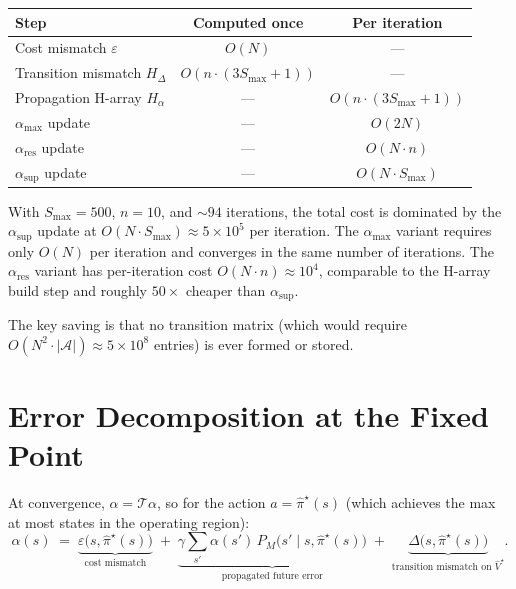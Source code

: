 \documentclass[11pt]{article}
\newcommand{\Smax}{S_{\max}}
\newcommand{\pihatstar}{\hat\pi^\star}
\newcommand{\Vhatstar}{\hat V^\star}
\newcommand{\alphares}{\alpha_{\mathrm{res}}}
\begin{document}
\begin{center}
\begin{tabular}{lcc}
\toprule
Step & Computed once & Per iteration \\
\midrule
Cost mismatch $\varepsilon$ & $O(N)$ & --- \\
Transition mismatch $H_\Delta$ & $O(n \cdot (3\Smax+1))$ & --- \\
Propagation H-array $H_\alpha$ & --- & $O(n \cdot (3\Smax+1))$ \\
$\alpha_{\max}$ update & --- & $O(2N)$ \\
$\alphares$ update & --- & $O(N \cdot n)$ \\
$\alpha_{\sup}$ update & --- & $O(N \cdot \Smax)$ \\
\bottomrule
\end{tabular}
\end{center}

With $\Smax = 500$, $n = 10$, and $\sim 94$ iterations, the total cost is
dominated by the $\alpha_{\sup}$ update at $O(N \cdot \Smax) \approx 5 \times
10^5$ per iteration.  The $\alpha_{\max}$ variant requires only $O(N)$ per
iteration and converges in the same number of iterations.  The $\alphares$
variant has per-iteration cost $O(N \cdot n) \approx 10^4$, comparable to the
H-array build step and roughly $50\times$ cheaper than $\alpha_{\sup}$.

The key saving is that no transition matrix (which would require
$O(N^2 \cdot |\mathcal{A}|) \approx 5 \times 10^8$ entries) is ever formed or
stored.

\section{Error Decomposition at the Fixed Point}

At convergence, $\alpha = \mathcal{T}\alpha$, so for the action
$a = \pihatstar(s)$ (which achieves the max at most states in the operating
region):
\begin{equation}\label{eq:decomposition}
  \alpha(s)
  \;=\; \underbrace{\varepsilon\bigl(s, \pihatstar(s)\bigr)}_{\text{cost mismatch}}
  \;+\; \underbrace{\gamma \sum_{s'} \alpha(s')\, P_M\bigl(s' \mid s, \pihatstar(s)\bigr)}_{\text{propagated future error}}
  \;+\; \underbrace{\Delta\bigl(s, \pihatstar(s)\bigr)}_{\text{transition mismatch on }\Vhatstar}.
\end{equation}
\end{document}
